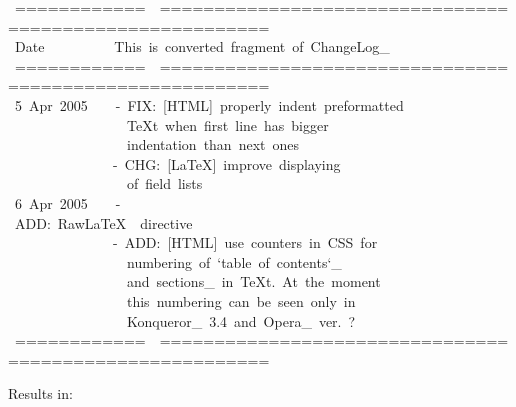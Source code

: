 \documentclass[12pt]{article}
\begin{document}
\begin{ttfamily}\begin{flushleft}
\mbox{~============~~========================================================}\\
\mbox{~Date~~~~~~~~~~This~is~converted~fragment~of~ChangeLog\_}\\
\mbox{~============~~========================================================}\\
\mbox{~5~Apr~2005~~~~-~FIX:~[HTML]~properly~indent~preformatted~~~~~~~~~~~~~~}\\
\mbox{~~~~~~~~~~~~~~~~~\TeX{}t~when~first~line~has~bigger~~~~~~~~~~~~~~~~~~~~~~~}\\
\mbox{~~~~~~~~~~~~~~~~~indentation~than~next~ones~~~~~~~~~~~~~~~~~~~~~~~~~~~~}\\
\mbox{~~~~~~~~~~~~~~~-~CHG:~[\LaTeX{}]~improve~displaying~~~~~~~~~~~~~~~~~~~~~~~}\\
\mbox{~~~~~~~~~~~~~~~~~of~field~lists~~~~~~~~~~~~~~~~~~~~~~~~~~~~~~~~~~~~~~~~}\\
\mbox{~6~Apr~2005~~~~-~ADD:~Raw\LaTeX{}~~directive~~~~~~~~~~~~~~~~~~~~~~~~~~~~~~}\\
\mbox{~~~~~~~~~~~~~~~-~ADD:~[HTML]~use~counters~in~CSS~for~~~~~~~~~~~~~~~~~~~}\\
\mbox{~~~~~~~~~~~~~~~~~numbering~of~`table~of~contents`\_~~~~~~~~~~~~~~~~~~~~~}\\
\mbox{~~~~~~~~~~~~~~~~~and~sections\_~in~\TeX{}t.~At~the~moment~~~~~~~~~~~~~~~~~~}\\
\mbox{~~~~~~~~~~~~~~~~~this~numbering~can~be~seen~only~in~~~~~~~~~~~~~~~~~~~~}\\
\mbox{~~~~~~~~~~~~~~~~~Konqueror\_~3.4~and~Opera\_~ver.~?~~~~~~~~~~~~~~~~~~~~~~}\\
\mbox{~============~~========================================================}\\
\end{flushleft}\end{ttfamily}

Results in:
\end{document}
